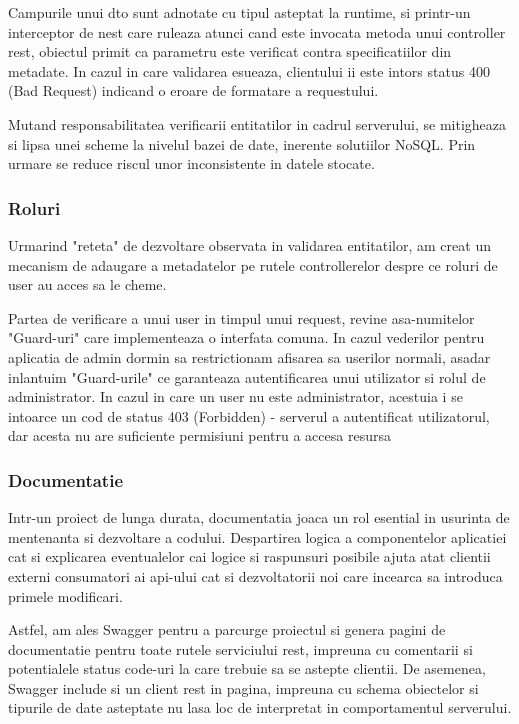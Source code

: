 Campurile unui \acrfull{dto} sunt adnotate cu tipul asteptat la runtime, si printr-un interceptor de nest care ruleaza atunci cand este invocata metoda unui controller \acrshort{rest}, obiectul primit ca parametru este verificat contra specificatiilor din metadate. In cazul in care validarea esueaza, clientului ii este intors status 400 (Bad Request) indicand o eroare de formatare a requestului.

Mutand responsabilitatea verificarii entitatilor in cadrul serverului, se mitigheaza si lipsa unei scheme la nivelul bazei de date, inerente solutiilor NoSQL. Prin urmare se reduce riscul unor inconsistente in datele stocate.

\subsubsection {Roluri}

Urmarind "reteta" de dezvoltare observata in validarea entitatilor, am creat un mecanism de adaugare a metadatelor pe rutele controllerelor despre ce roluri de user au acces sa le cheme.

Partea de verificare a unui user in timpul unui request, revine asa-numitelor "Guard-uri" care implementeaza o interfata comuna. In cazul vederilor pentru aplicatia de admin dormin sa restrictionam afisarea sa userilor normali, asadar inlantuim "Guard-urile" ce garanteaza autentificarea unui utilizator si rolul de administrator. In cazul in care un user nu este administrator, acestuia i se intoarce un cod de status 403 (Forbidden) - serverul a autentificat utilizatorul, dar acesta nu are suficiente permisiuni pentru a accesa resursa

\subsubsection {Documentatie}

Intr-un proiect de lunga durata, documentatia joaca un rol esential in usurinta de mentenanta si dezvoltare a codului. Despartirea logica a componentelor aplicatiei cat si explicarea eventualelor cai logice si raspunsuri posibile ajuta atat clientii externi consumatori ai \acrshort{api}-ului cat si dezvoltatorii noi care incearca sa introduca primele modificari.

Astfel, am ales Swagger pentru a parcurge proiectul si genera pagini de documentatie pentru toate rutele serviciului \acrshort{rest}, impreuna cu comentarii si potentialele status code-uri la care trebuie sa se astepte clientii. De asemenea, Swagger include si un client \acrshort{rest} in pagina, impreuna cu schema obiectelor si tipurile de date asteptate nu lasa loc de interpretat in comportamentul serverului.

